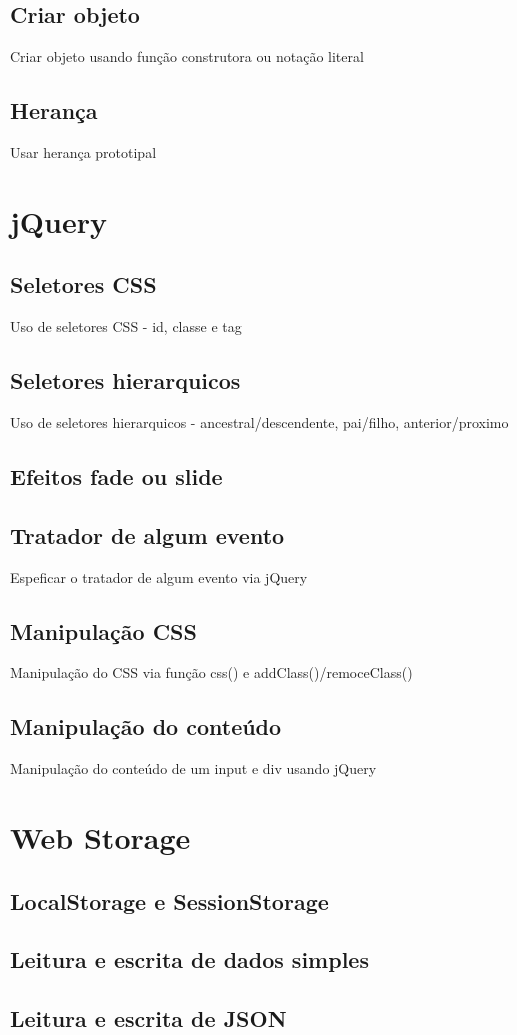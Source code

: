 \subsection{Criar objeto}
Criar objeto usando função construtora ou notação literal
\subsection{Herança}
Usar herança prototipal


\section{jQuery}
\subsection{Seletores CSS}
Uso de seletores CSS - id, classe e tag
\subsection{Seletores hierarquicos}
Uso de seletores hierarquicos - ancestral/descendente, pai/filho, anterior/proximo
\subsection{Efeitos fade ou slide}
\subsection{Tratador de algum evento}
Espeficar o tratador de algum evento via jQuery
\subsection{Manipulação CSS}
Manipulação do CSS via função css() e addClass()/remoceClass()
\subsection{Manipulação do conteúdo}
Manipulação do conteúdo de um input e div usando jQuery

\section{Web Storage }
\subsection{LocalStorage e SessionStorage}
\subsection{Leitura e escrita de dados simples}
\subsection{Leitura e escrita de JSON}
